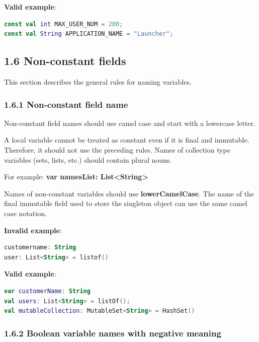 {{{{{{{{{{{{{{{{\textbf{Valid example}:



\begin{lstlisting}[language=Kotlin]
const val int MAX_USER_NUM = 200;
const val String APPLICATION_NAME = "Launcher";
\end{lstlisting}


\subsection*{\textbf{1.6 Non-constant fields}}

\label{sec:1.6}

This section describes the general rules for naming variables.

\subsubsection*{\textbf{1.6.1 Non-constant field name}}
\leavevmode\newline

\label{sec:1.6.1}

Non-constant field names should use camel case and start with a lowercase letter.

A local variable cannot be treated as constant even if it is final and immutable. Therefore, it should not use the preceding rules. Names of collection type variables (sets, lists, etc.) should contain plural nouns.

For example: \textbf{var namesList: List<String>}



Names of non-constant variables should use \textbf{lowerCamelCase}. The name of the final immutable field used to store the singleton object can use the same camel case notation.



\textbf{Invalid example}: 

\begin{lstlisting}[language=Kotlin]
customername: String
user: List<String> = listof()
\end{lstlisting}


\textbf{Valid example}: 

\begin{lstlisting}[language=Kotlin]
var customerName: String
val users: List<String> = listOf();
val mutableCollection: MutableSet<String> = HashSet()
\end{lstlisting}


\subsubsection*{\textbf{1.6.2 Boolean variable names with negative meaning}}
\leavevmode\newline

}}}}}}}}}}}}}}}}
